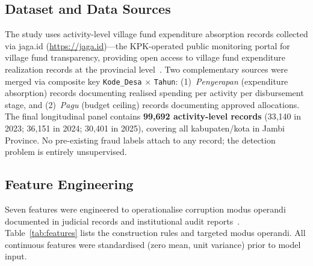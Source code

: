 \documentclass[3p,times,procedia]{elsarticle}
\begin{document}
\subsection{Dataset and Data Sources}

The study uses activity-level village fund expenditure absorption records collected via jaga.id (\url{https://jaga.id})---the KPK-operated public monitoring portal for village fund transparency, providing open access to village fund expenditure realization records at the provincial level~\cite{ref9}. Two complementary sources were merged via composite key \texttt{Kode\_Desa} $\times$ \texttt{Tahun}: (1)~\textit{Penyerapan} (expenditure absorption) records documenting realised spending per activity per disbursement stage, and (2)~\textit{Pagu} (budget ceiling) records documenting approved allocations. The final longitudinal panel contains \textbf{99,692 activity-level records} (33,140 in 2023; 36,151 in 2024; 30,401 in 2025), covering all kabupaten/kota in Jambi Province. No pre-existing fraud labels attach to any record; the detection problem is entirely unsupervised.

\subsection{Feature Engineering}
\label{sec:features}

Seven features were engineered to operationalise corruption modus operandi documented in judicial records and institutional audit reports~\cite{ref13,ref14}. Table~\ref{tab:features} lists the construction rules and targeted modus operandi. All continuous features were standardised (zero mean, unit variance) prior to model input.
\end{document}
